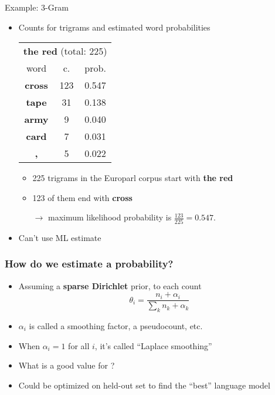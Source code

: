 \documentclass[compress]{beamer}
\begin{document}
\begin{frame}{Example: 3-Gram}

\begin{itemize}
\item Counts for trigrams and estimated word probabilities
\begin{center}

\begin{tabular}{c|c|c}
\multicolumn{3}{c}{{\bf the red} (total: 225)}\\[1mm]
word & c. & prob. \\ \hline \hline
{\bf cross} & 123 & 0.547 \\ \hline
{\bf tape} & 31 & 0.138 \\ \hline
{\bf army} & 9 & 0.040 \\ \hline
{\bf card} & 7 & 0.031 \\ \hline
{\bf ,} & 5 & 0.022 \\ \hline
\end{tabular}

\end{center}

\begin{itemize}
\item 225 trigrams in the Europarl corpus start with {\bf the red}
\item 123 of them end with {\bf cross}
\item[$\rightarrow$] maximum likelihood probability is $\frac{123}{225}=0.547$.
\end{itemize}
\pause
\item Can't use ML estimate
\end{itemize}

\end{frame}


\begin{frame}
\frametitle{How do we estimate a probability?}

\begin{itemize}
   \item Assuming a {\bf sparse Dirichlet} prior,  to each count
     \begin{equation}
       \theta_{i} = \frac{n_i + \alpha_i}{\sum_k {n_k + \alpha_k}}
     \end{equation}
   \item $\alpha_i$ is called a smoothing factor, a pseudocount, etc.
     \pause
   \item When $\alpha_i = 1$ for all $i$, it's called ``Laplace smoothing''
     \pause
   \item What is a good value for  \maths{$\alpha$}?
   \item Could be optimized on held-out set to find the ``best'' language model
\end{itemize}
\end{frame}
\end{document}
